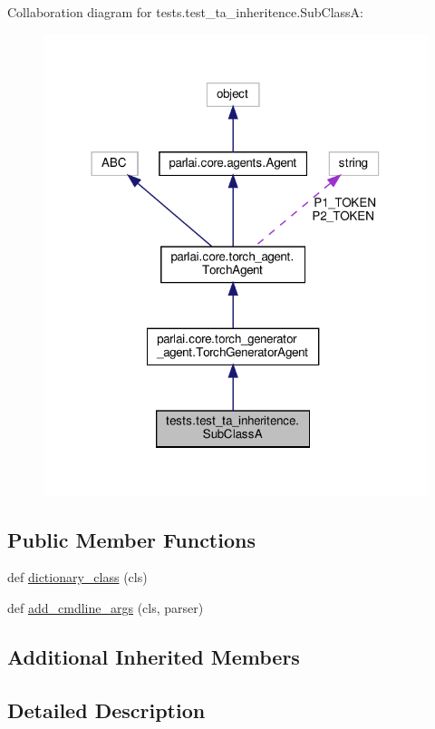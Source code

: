 Collaboration diagram for tests.\+test\+\_\+ta\+\_\+inheritence.\+Sub\+ClassA\+:
\nopagebreak
\begin{figure}[H]
\begin{center}
\leavevmode
\includegraphics[width=318pt]{de/dd9/classtests_1_1test__ta__inheritence_1_1SubClassA__coll__graph}
\end{center}
\end{figure}
\subsection*{Public Member Functions}
\begin{DoxyCompactItemize}
\item 
def \hyperlink{classtests_1_1test__ta__inheritence_1_1SubClassA_aa01b5f43121b539c377b9b1d50f93d0c}{dictionary\+\_\+class} (cls)
\item 
def \hyperlink{classtests_1_1test__ta__inheritence_1_1SubClassA_a088369e91c8005b70d20f17032998215}{add\+\_\+cmdline\+\_\+args} (cls, parser)
\end{DoxyCompactItemize}
\subsection*{Additional Inherited Members}


\subsection{Detailed Description}


